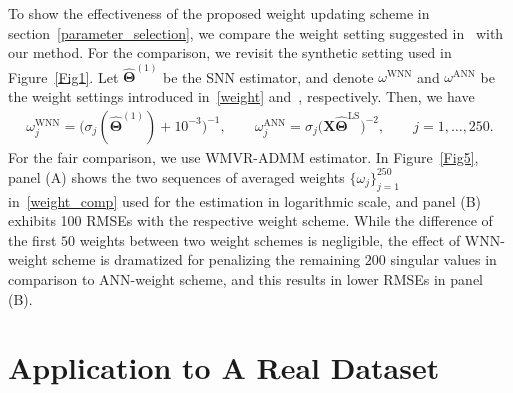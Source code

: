 \documentclass[alpha-refs]{wiley-article}
\begin{document}
To show the effectiveness of the proposed weight updating scheme in section~\ref{parameter_selection},
we compare the weight setting suggested in~\citet{chen2013reduced} with our method.
For the comparison, we revisit the synthetic setting used in Figure~\ref{Fig1}.
Let $\widehat{\boldsymbol{\Theta}}^{(1)}$ be the SNN estimator, and denote $\omega^{\text{WNN}}$ 
and $\omega^{\text{ANN}}$ be the weight settings introduced in~\eqref{weight} and~\citet{chen2013reduced}, respectively.
Then, we have 
\begin{align} \label{weight_comp}
    \omega_{j}^{\text{WNN}} = 
    \big(\sigma_{j}(\widehat{\boldsymbol{\Theta}}^{(1)})+10^{-3}\big)^{-1},
    \qquad 
    \omega_{j}^{\text{ANN}} = 
    \sigma_{j}\big( \boldsymbol{X}\widehat{\boldsymbol{\Theta}}^{\text{LS}} \big)^{-2},
    \qquad j=1,\dots,250.
\end{align}
For the fair comparison, we use WMVR-ADMM estimator.
In Figure~\ref{Fig5}, panel (A) shows the two sequences of averaged weights $\{\omega_{j}\}_{j=1}^{250}$ in~\eqref{weight_comp} used for the estimation in logarithmic scale, 
and panel (B) exhibits 100 RMSEs with the respective weight scheme.
While the difference of the first $50$ weights between two weight schemes is negligible, the effect of WNN-weight scheme is dramatized for penalizing the remaining $200$ singular values in comparison to ANN-weight scheme, and this results in lower RMSEs in panel (B).


\section{Application to A Real Dataset}

\end{document}
